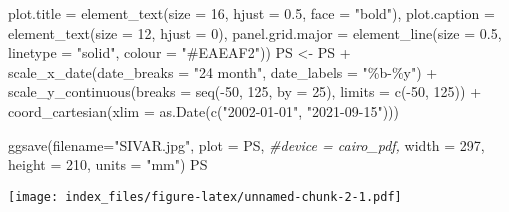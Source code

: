 \documentclass[
]{book}
\newenvironment{Shaded}{\begin{snugshade}}{\end{snugshade}}
\newcommand{\AttributeTok}[1]{\textcolor[rgb]{0.77,0.63,0.00}{#1}}
\newcommand{\CommentTok}[1]{\textcolor[rgb]{0.56,0.35,0.01}{\textit{#1}}}
\newcommand{\DecValTok}[1]{\textcolor[rgb]{0.00,0.00,0.81}{#1}}
\newcommand{\FloatTok}[1]{\textcolor[rgb]{0.00,0.00,0.81}{#1}}
\newcommand{\FunctionTok}[1]{\textcolor[rgb]{0.00,0.00,0.00}{#1}}
\newcommand{\NormalTok}[1]{#1}
\newcommand{\OtherTok}[1]{\textcolor[rgb]{0.56,0.35,0.01}{#1}}
\newcommand{\SpecialCharTok}[1]{\textcolor[rgb]{0.00,0.00,0.00}{#1}}
\newcommand{\StringTok}[1]{\textcolor[rgb]{0.31,0.60,0.02}{#1}}
\begin{document}
\begin{Shaded}
\begin{Highlighting}[]
    \AttributeTok{plot.title =} \FunctionTok{element\_text}\NormalTok{(}\AttributeTok{size =} \DecValTok{16}\NormalTok{, }\AttributeTok{hjust =} \FloatTok{0.5}\NormalTok{, }\AttributeTok{face =} \StringTok{"bold"}\NormalTok{),}
    \AttributeTok{plot.caption =} \FunctionTok{element\_text}\NormalTok{(}\AttributeTok{size =} \DecValTok{12}\NormalTok{, }\AttributeTok{hjust =} \DecValTok{0}\NormalTok{), }\AttributeTok{panel.grid.major =} \FunctionTok{element\_line}\NormalTok{(}\AttributeTok{size =} \FloatTok{0.5}\NormalTok{,}
        \AttributeTok{linetype =} \StringTok{"solid"}\NormalTok{, }\AttributeTok{colour =} \StringTok{"\#EAEAF2"}\NormalTok{))}
\NormalTok{PS }\OtherTok{\textless{}{-}}\NormalTok{ PS }\SpecialCharTok{+} \FunctionTok{scale\_x\_date}\NormalTok{(}\AttributeTok{date\_breaks =} \StringTok{"24 month"}\NormalTok{, }\AttributeTok{date\_labels =} \StringTok{"\%b{-}\%y"}\NormalTok{) }\SpecialCharTok{+}
    \FunctionTok{scale\_y\_continuous}\NormalTok{(}\AttributeTok{breaks =} \FunctionTok{seq}\NormalTok{(}\SpecialCharTok{{-}}\DecValTok{50}\NormalTok{, }\DecValTok{125}\NormalTok{, }\AttributeTok{by =} \DecValTok{25}\NormalTok{), }\AttributeTok{limits =} \FunctionTok{c}\NormalTok{(}\SpecialCharTok{{-}}\DecValTok{50}\NormalTok{,}
        \DecValTok{125}\NormalTok{)) }\SpecialCharTok{+} \FunctionTok{coord\_cartesian}\NormalTok{(}\AttributeTok{xlim =} \FunctionTok{as.Date}\NormalTok{(}\FunctionTok{c}\NormalTok{(}\StringTok{"2002{-}01{-}01"}\NormalTok{,}
    \StringTok{"2021{-}09{-}15"}\NormalTok{)))}
\end{Highlighting}
\end{Shaded}

\begin{Shaded}
\begin{Highlighting}[]
\FunctionTok{ggsave}\NormalTok{(}\AttributeTok{filename=}\StringTok{"SIVAR.jpg"}\NormalTok{,}
       \AttributeTok{plot =}\NormalTok{ PS,}
       \CommentTok{\#device = cairo\_pdf,}
       \AttributeTok{width =} \DecValTok{297}\NormalTok{,}
       \AttributeTok{height =} \DecValTok{210}\NormalTok{,}
       \AttributeTok{units =} \StringTok{"mm"}\NormalTok{)}
\NormalTok{PS}
\end{Highlighting}
\end{Shaded}

\texttt{[image: index\_files/figure-latex/unnamed-chunk-2-1.pdf]}

  
\end{document}
